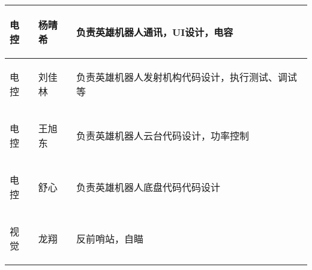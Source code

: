 \begin{longtable}{ p{2cm} | p{3.5cm} | p{9.3cm} |}
    \hline
    
        \begin{center}
            电控
        \end{center}&
        \begin{center}
            杨晴希
        \end{center}&
        \begin{center}
            负责英雄机器人通讯，UI设计，电容
        \end{center}\\
    
    \hline

        \begin{center}
            电控
        \end{center}&
        \begin{center}
            刘佳林
        \end{center}&
        \begin{center}
            负责英雄机器人发射机构代码设计，执行测试、调试等
        \end{center}\\

    \hline
    
        \begin{center}
            电控
        \end{center}&
        \begin{center}
            王旭东
        \end{center}&
        \begin{center}
            负责英雄机器人云台代码设计，功率控制
        \end{center}\\

    \hline

        \begin{center}
            电控
        \end{center}&
        \begin{center}
            舒心
        \end{center}&
        \begin{center}
            负责英雄机器人底盘代码代码设计
        \end{center}\\
        
    \hline
    
        \begin{center}
            视觉
        \end{center}&
        \begin{center}
            龙翔
        \end{center}&
        \begin{center}
            反前哨站，自瞄
        \end{center}\\


\end{longtable}
